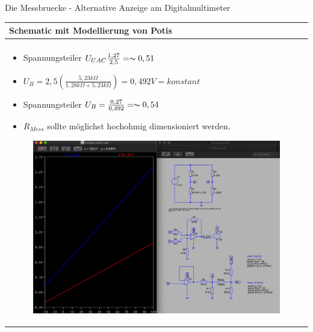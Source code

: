 \begin{frame}[t]{Die Messbruecke - Alternative Anzeige am Digitalmultimeter} 
    
    \begin{spacing}{0.9} \begin{tiny}
      \begin{table}[h!]
      \begin{tabular}{p{10cm} }
        \hline
        \textbf{Schematic mit Modellierung von Potis} \\
        \hline \\
        \begin{minipage}{\textwidth}  
             \begin{itemize}
                 \item Spannungsteiler $U_{UAC} \frac{1,27}{2,5}=\thicksim 0,51$
                 \item $U_{B}=2,5(\frac{5,23k\Omega}{1,28k\Omega+5,23k\Omega})=0,492V=konstant$
                 \item Spannungsteiler $U_{B}=\frac{0,27}{0,492}=\thicksim 0,54$
                 \item $R_{Mess}$ sollte möglichst hochohmig dimensioniert werden.
             \end{itemize}
            \begin{figure}
                \centering
                \includegraphics[width=0.7\linewidth]{pictures/digi_mul_anpassung.png}
            \end{figure}
        \end{minipage} 
    \end{tabular}

    \end{table}
     
    \end{tiny} \end{spacing}

\end{frame}

